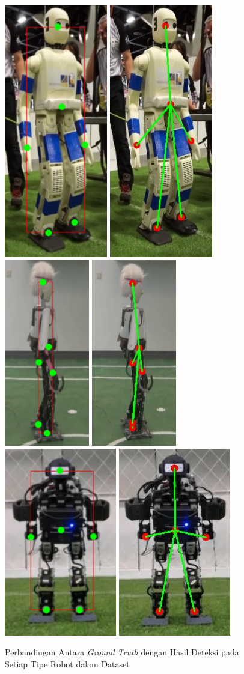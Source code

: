 \begin{figure}
  \\[\medskipamount]
  \includegraphics[width=.12\textwidth]{gambar/comp_with_gt/robot_10_gt.png}
  \includegraphics[width=.12\textwidth]{gambar/comp_with_gt/robot_10_res.png} \hfill%
  \includegraphics[width=.137\textwidth]{gambar/comp_with_gt/robot_11_gt.png}
  \includegraphics[width=.137\textwidth]{gambar/comp_with_gt/robot_11_res.png} \hfill%
  \includegraphics[width=.18\textwidth]{gambar/comp_with_gt/robot_12_gt.png}
  \includegraphics[width=.18\textwidth]{gambar/comp_with_gt/robot_12_res.png}
  \centering
  \captionsetup{justification=centering, margin=2cm}
  \caption{Perbandingan Antara \textit{Ground Truth} dengan Hasil Deteksi pada Setiap Tipe Robot dalam Dataset}
  \label{fig:comparisongtandresult}
\end{figure}